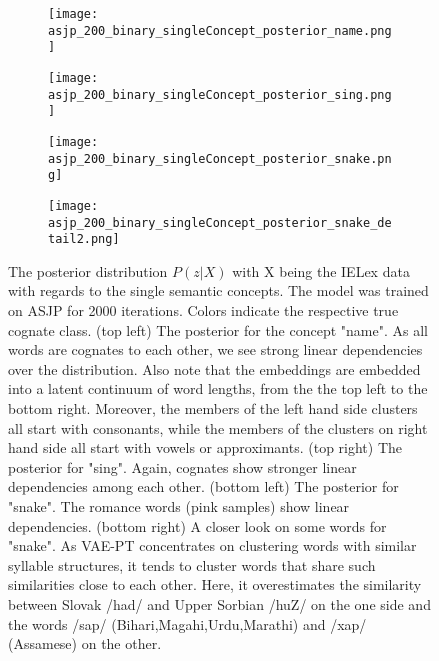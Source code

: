\documentclass[6pt]{article}
\begin{document}
{ \begin{figure}[ht] 
  \begin{subfigure}[b]{0.5\linewidth}
    \centering
    \texttt{[image: asjp\_200\_binary\_singleConcept\_posterior\_name.png]} 
    \label{fig:vae_phono_orthofeatures0} 
    \vspace{4ex}
  \end{subfigure}%
  \begin{subfigure}[b]{0.5\linewidth}
    \centering
    \texttt{[image: asjp\_200\_binary\_singleConcept\_posterior\_sing.png]} 
    \label{fig:vae_phono_orthofeatures1} 
    \vspace{4ex}
  \end{subfigure} 
  \begin{subfigure}[b]{0.5\linewidth}
    \centering
    \texttt{[image: asjp\_200\_binary\_singleConcept\_posterior\_snake.png]} 
    \label{fig:vae_phono_orthofeatures2} 
  \end{subfigure}%
  \begin{subfigure}[b]{0.5\linewidth}
    \centering
    \texttt{[image: asjp\_200\_binary\_singleConcept\_posterior\_snake\_detail2.png]} 
    \label{fig:vae_phono_orthofeatures3} 
  \end{subfigure} 
  \caption{The posterior distribution $P(z|X)$ with X being the IELex data with regards to the single semantic concepts. The model was trained on ASJP for 2000 iterations. Colors indicate the respective true cognate class. (top left) The posterior for the concept "name". As all words are cognates to each other, we see strong linear dependencies over the distribution. Also note that the embeddings are embedded into a latent continuum of word lengths, from the the top left to the bottom right. Moreover, the members of the left hand side clusters all start with consonants, while the members of the clusters on right hand side all start with vowels or approximants. (top right) The posterior for "sing". Again, cognates show stronger linear dependencies among each other. (bottom left) The posterior for "snake". The romance words (pink samples) show linear dependencies. (bottom right) A closer look on some words for "snake". As VAE-PT concentrates on clustering words with similar syllable structures, it tends to cluster words that share such similarities close to each other. Here, it overestimates the similarity between Slovak /had/ and Upper Sorbian /huZ/ on the one side and the words /sap/ (Bihari,Magahi,Urdu,Marathi) and /xap/ (Assamese) on the other.  }
  \label{fig:asjp_2000_binary_singleIELEXConcepts_posteriors} 
\end{figure}


}
\end{document}
